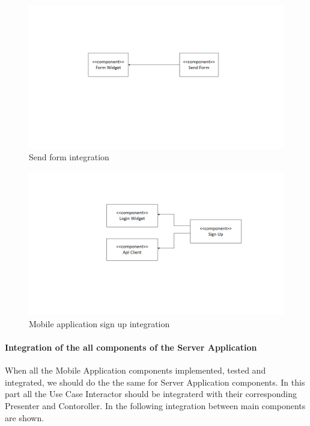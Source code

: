 \begin{figure}[H]
\centering
\includegraphics[width=\textwidth]{Images/SendForm.png}
\caption{\label{fig:SendFormIntegrationn} Send form integration}
\end{figure}

\begin{figure}[H]
\centering
\includegraphics[width=\textwidth]{Images/SignUpIntegration.png}
\caption{\label{fig:SignUpIntegration} Mobile application sign up integration}
\end{figure}

\paragraph{Integration of the all components of the Server Application}
When all the Mobile Application components implemented, tested and integrated, we should do the the same for Server Application components. In this part all the Use Case Interactor should be integraterd with their corresponding Presenter and Contoroller. In the following integration between main components are shown.

